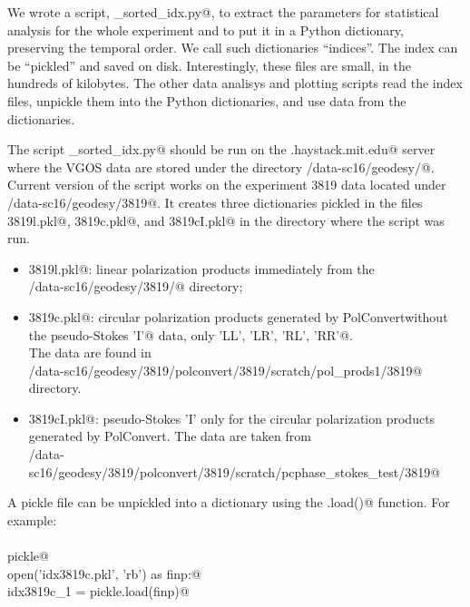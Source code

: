 \documentclass[letterpaper,twoside,12pt]{article}
\begin{document}
We wrote a script, \verb@make_sorted_idx.py@, to extract the parameters for statistical analysis for the whole experiment and to put it in a Python dictionary, preserving the temporal order. We call such dictionaries ``indices''. The index can be ``pickled'' and saved on disk. Interestingly, these files are small, in the hundreds of kilobytes.  The other data analisys and plotting scripts read the index files, unpickle them into the Python dictionaries, and use data from the dictionaries.

The script \verb@make_sorted_idx.py@ should be run on the \verb@demi.haystack.mit.edu@ server where the VGOS data are stored under the directory \verb@/data-sc16/geodesy/@. Current version of the script works on the experiment 3819 data located under \verb@/data-sc16/geodesy/3819@. It creates three dictionaries pickled in the files \verb@idx3819l.pkl@, \verb@idx3819c.pkl@, and \verb@idx3819cI.pkl@ in the directory where the script was run. 

\begin{itemize}
  \item \verb@idx3819l.pkl@: linear polarization products immediately from the \\
  \verb@/data-sc16/geodesy/3819/@ directory;
  
  \item \verb@idx3819c.pkl@: circular polarization products generated by PolConvertwithout the pseudo-Stokes
      \verb@'I'@ data, only \verb@'LL', 'LR', 'RL', 'RR'@. \\
  The data are found in \\
  \verb@/data-sc16/geodesy/3819/polconvert/3819/scratch/pol_prods1/3819@ directory.

  \item \verb@idx3819cI.pkl@: pseudo-Stokes 'I' only for the circular polarization products generated by
  PolConvert. The data are taken from \\
  \verb@/data-sc16/geodesy/3819/polconvert/3819/scratch/pcphase_stokes_test/3819@ \\
\end{itemize}

A pickle file can be unpickled into a  dictionary using the \verb@pickle.load()@ function. For example: \\ \\
\noindent \verb@import pickle@ \\
\noindent \verb@with open('idx3819c.pkl', 'rb') as finp:@ \\
\noindent \verb@    idx3819c_1 = pickle.load(finp)@ \\ \\
\end{document}
